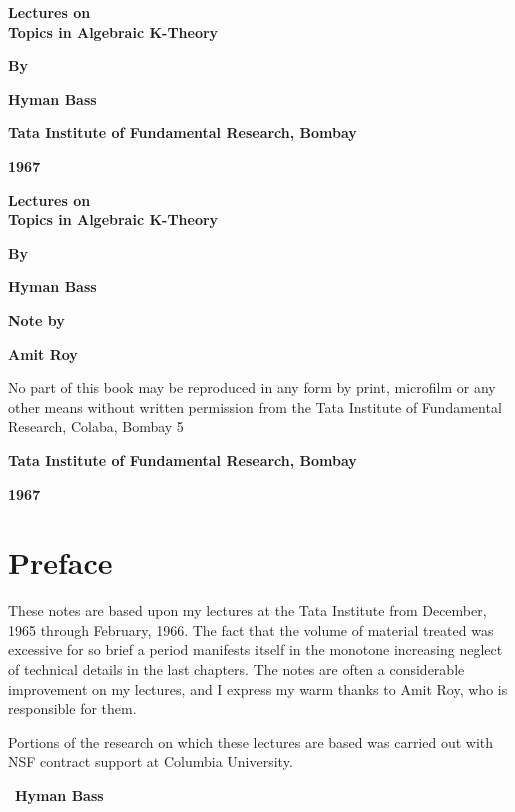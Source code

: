 \thispagestyle{empty}
\begin{center}
{\Large\bf Lectures on}\\[5pt]
{\Large\bf Topics in Algebraic K-Theory}
\vskip 1cm


{\large\bf By}
\medskip

{\large\bf Hyman Bass}
\vfill


{\bf Tata Institute of Fundamental Research, Bombay}

{\bf 1967}

\end{center}
\eject



\thispagestyle{empty}
\begin{center}
{\Large\bf Lectures on}\\[5pt]
{\Large\bf Topics in Algebraic K-Theory}
\vskip 1cm

{\bf By}
\medskip

{\large\bf Hyman Bass}\\
\vfill

{\bf Note by}
\medskip

{\large\bf Amit Roy}
\vfill

\parbox{0.7\textwidth}{No part of this book may be reproduced
in any form by print, microfilm or any
other means without written permission
from the Tata Institute of Fundamental
Research, Colaba, Bombay 5}

\vfill

{\bf Tata Institute of Fundamental Research, Bombay}

{\bf 1967}
\end{center}
\eject

\thispagestyle{empty}
\chapter*{Preface}


These notes are based upon my lectures at the Tata Institute from
December, 1965 through February, 1966. The fact that the volume of
material treated was excessive for so brief a period manifests itself
in the monotone increasing neglect of technical details in the last
chapters. The notes are often a considerable improvement on my
lectures, and I express my warm thanks to Amit Roy, who is responsible
for them.


Portions of the research on which these lectures are based was
carried out with NSF contract support at Columbia University.
\vskip 1cm



~\hfill{\large\bf Hyman Bass}

